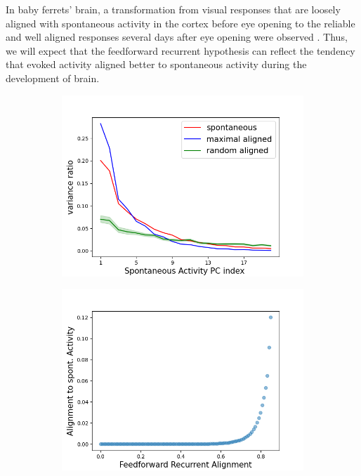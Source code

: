\documentclass[11pt]{article}
\begin{document}
	In baby ferrets' brain, a transformation from visual responses that are loosely aligned with spontaneous activity in the cortex before eye opening to the reliable and well aligned responses several days after eye opening were observed \cite{tragenap2023nature}. Thus, we will expect that the feedforward recurrent hypothesis can reflect the tendency that evoked activity aligned better to spontaneous activity during the development of brain. 
	\vspace{-0.4cm}
		\begin{figure}[H] 
			\centering
			\begin{subfigure}[b]{0.45\textwidth} 
				\includegraphics[width=\textwidth]{../figures/align_to_spont_act_variance_ratio.png}
				\caption{}
				\label{fig:variance_ratio_sym}
			\end{subfigure}
			\begin{subfigure}[b]{0.45\textwidth}
				\includegraphics[width=\textwidth]{../figures/spont_align_ffrec_sym.png}

\end{subfigure}
\end{figure}
\end{document}
